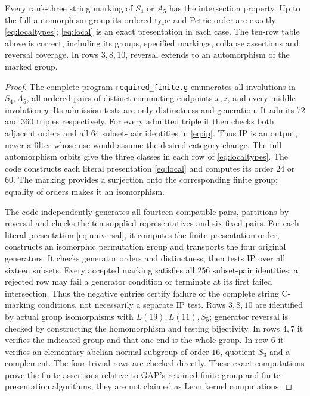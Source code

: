 \begin{lemma}\label{lemma:finite}
Every rank-three string marking of $S_4$ or $A_5$ has the intersection
property. Up to the full automorphism group its ordered type and Petrie
order are exactly \eqref{eq:localtypes}; \eqref{eq:local} is an exact
presentation in each case. The ten-row table above is correct, including
its groups, specified markings, collapse assertions and reversal coverage.
In rows $3,8,10$, reversal extends to an automorphism of the marked group.
\end{lemma}
\begin{proof}
The complete program \texttt{required\_finite.g} enumerates all involutions
in $S_4,A_5$, all ordered pairs of distinct commuting endpoints $x,z$,
and every middle involution $y$. Its admission tests are only distinctness
and generation. It admits $72$ and $360$ triples respectively. For every
admitted triple it then checks both adjacent orders and all $64$
subset-pair identities in \eqref{eq:ip}. Thus IP is an output, never a
filter whose use would assume the desired category change. The full
automorphism orbits give the three classes in each row of
\eqref{eq:localtypes}. The code constructs each literal presentation
\eqref{eq:local} and computes its order $24$ or $60$. The marking
provides a surjection onto the corresponding finite group; equality of
orders makes it an isomorphism.

The code independently generates all fourteen compatible pairs, partitions
by reversal and checks the ten supplied representatives and six fixed
pairs. For each literal presentation \eqref{eq:universal}, it computes
the finite presentation order, constructs an isomorphic permutation group
and transports the four original generators. It checks generator orders and distinctness, then tests IP over all sixteen
subsets. Every accepted marking satisfies all $256$ subset-pair identities;
a rejected row may fail a generator condition or terminate at its first
failed intersection. Thus the negative entries certify failure of the
complete string C-marking conditions, not necessarily a separate IP test.
Rows $3,8,10$ are identified by actual group isomorphisms with
$L(19),L(11),S_5$; generator reversal is checked by constructing the
homomorphism and testing bijectivity. In rows $4,7$ it verifies the indicated group and that
one end is the whole group. In row $6$ it verifies an elementary abelian
normal subgroup of order $16$, quotient $S_3$ and a complement. The four
trivial rows are checked directly. These exact computations prove the
finite assertions relative to GAP's retained finite-group and finite-
presentation algorithms; they are not claimed as Lean kernel computations.
\end{proof}

